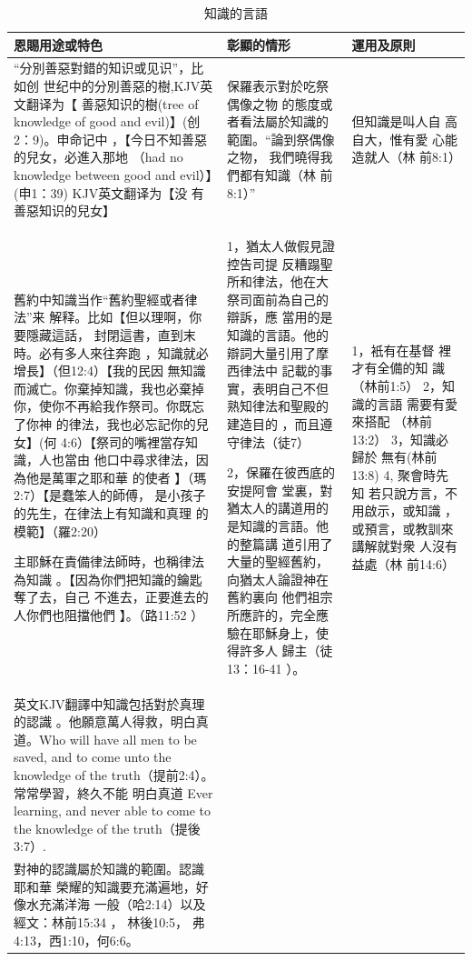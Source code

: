 \begin{table}[H]
  \centering
    \begin{tabular}{p{15.145em}|p{15.785em}|p{16.5em}}    \toprule
    \multicolumn{1}{p{15.145em}|}{\textbf{恩賜用途或特色}} & \multicolumn{1}{p{15.785em}|}{\textbf{彰顯的情形}} &  \multicolumn{1}{p{16.5em}}{\textbf{運用及原則}} \\    \midrule

“分別善惡對錯的知识或见识”，比如创
世纪中的分別善惡的樹,KJV英文翻译为【
善惡知识的樹(tree of knowledge of
good and evil)】(创2：9)。申命记中
，【今日不知善惡的兒女，必進入那地
（had no knowledge between good and
evil）】(申1：39) KJV英文翻译为【没
有善惡知识的兒女】&
保羅表示對於吃祭偶像之物
的態度或者看法屬於知識的
範圍。“論到祭偶像之物，
我們曉得我們都有知識（林
前8:1）”&
但知識是叫人自
高自大，惟有愛
心能造就人（林
前8:1）\\    \midrule

舊約中知識当作“舊約聖經或者律法”来
解释。比如【但以理啊，你要隱藏這話，
封閉這書，直到末時。必有多人來往奔跑
，知識就必增長】（但12:4）【我的民因
無知識而滅亡。你棄掉知識，我也必棄掉
你，使你不再給我作祭司。你既忘了你神
的律法，我也必忘記你的兒女】(何
4:6）【祭司的嘴裡當存知識，人也當由
他口中尋求律法，因為他是萬軍之耶和華
的使者 】（瑪2:7）【是蠢笨人的師傅，
是小孩子的先生，在律法上有知識和真理
的模範】（羅2:20）

主耶穌在責備律法師時，也稱律法為知識
。【因為你們把知識的鑰匙奪了去，自己
不進去，正要進去的人你們也阻擋他們
】。（路11:52 ）
&
1，猶太人做假見證控告司提
反糟蹋聖所和律法，他在大
祭司面前為自己的辯訴，應
當用的是知識的言語。他的
辯詞大量引用了摩西律法中
記載的事實，表明自己不但
熟知律法和聖殿的建造目的
，而且遵守律法（徒7）

2，保羅在彼西底的安提阿會
堂裏，對猶太人的講道用的
是知識的言語。他的整篇講
道引用了大量的聖經舊約，向猶太人論證神在舊約裏向
他們祖宗所應許的，完全應
驗在耶穌身上，使得許多人
歸主（徒13：16-41 ）。&

1，衹有在基督
裡才有全備的知
識（林前1:5）
2，知識的言語
需要有愛來搭配
（林前13:2）
3，知識必歸於
無有(林前13:8)
4, 聚會時先知
若只說方言，不
用啟示，或知識
，或預言，或教訓來講解就對衆
人沒有益處（林
前14:6）\\    \midrule

英文KJV翻譯中知識包括對於真理的認識
。他願意萬人得救，明白真道。Who will
have all men to be saved, and to
come unto the knowledge of the
truth（提前2:4）。常常學習，終久不能
明白真道 Ever learning, and never
able to come to the knowledge of the
truth（提後3:7）.&&\\    \midrule
對神的認識屬於知識的範圍。認識耶和華
榮耀的知識要充滿遍地，好像水充滿洋海
一般（哈2:14）以及經文：林前15:34 ，
林後10:5， 弗4:13，西1:10，何6:6。&&\\    \midrule
\end{tabular}%
\caption{知識的言語}
\label{tab:addlabel}%
\end{table}%


